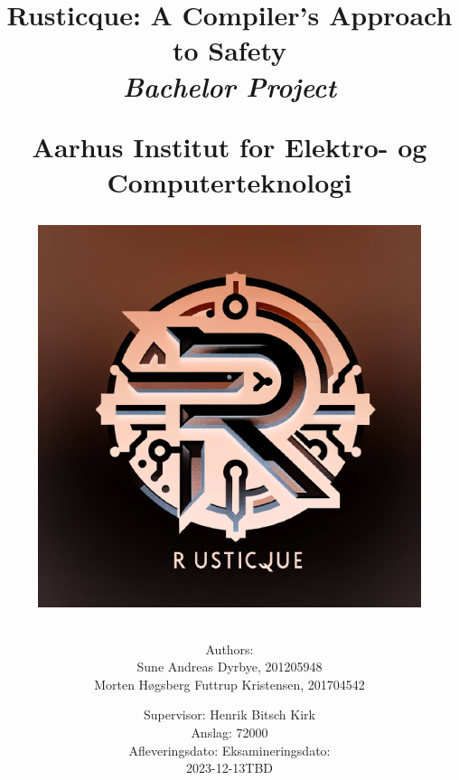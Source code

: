 \newcommand{\authorName}{}
\newcommand{\titleName}{Rusticque: A Compiler's Approach to Safety}
\newcommand{\subject}{Bachelor Project}
\newcommand{\vejleder}{Supervisor: Henrik Bitsch Kirk}
\newcommand{\institute}{Aarhus Institut for Elektro- og Computerteknologi}
\begin{titlepage}
  \centering
    \title
    {
      \Huge \textbf{\titleName}\\
      \scale{\numberSQRTTWO}{\vspace{\sol pt}}
      \LARGE \textit{\subject}
      \scale{\numberSQRTTWO}{\rule{\linewidth}{\sol pt}}

      \textbf{\institute}

      \begin{figure}[h]
        \centering
        \includegraphics[scale=0.50]{02-Body/Images/rusticqueLogo.png}
      \end{figure}

      \author
    {
      \LARGE Authors: \\
      Sune Andreas Dyrbye, 201205948 \\
      Morten Høgsberg Futtrup Kristensen, 201704542 \\
      }
           \date{
        \Large \vejleder \\
        Anslag: 72000\\
        \vspace{1em}
        Afleveringsdato: \hfill
        Eksamineringsdato:\\
        2023-12-13\hfill TBD
      }


    }
   
\end{titlepage}
